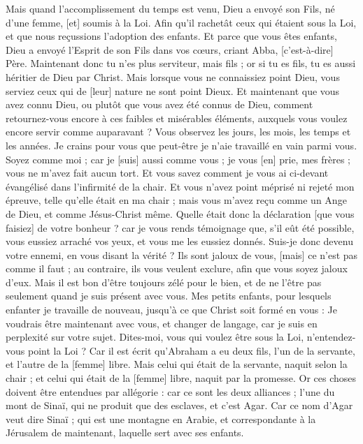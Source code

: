\begin{multicols}{2}
Mais quand l'accomplissement du temps est venu, Dieu a envoyé son Fils, né d'une femme, [et] soumis à la Loi.
Afin qu'il rachetât ceux qui étaient sous la Loi, et que nous reçussions l'adoption des enfants.
Et parce que vous êtes enfants, Dieu a envoyé l'Esprit de son Fils dans vos cœurs, criant Abba, [c'est-à-dire] Père.
Maintenant donc tu n'es plus serviteur, mais fils ; or si tu es fils, tu es aussi héritier de Dieu par Christ.
Mais lorsque vous ne connaissiez point Dieu, vous serviez ceux qui de [leur] nature ne sont point Dieux.
Et maintenant que vous avez connu Dieu, ou plutôt que vous avez été connus de Dieu, comment retournez-vous encore à ces faibles et misérables éléments, auxquels vous voulez encore servir comme auparavant ?
Vous observez les jours, les mois, les temps et les années.
Je crains pour vous que peut-être je n'aie travaillé en vain parmi vous.
Soyez comme moi ; car je [suis] aussi comme vous ; je vous [en] prie, mes frères ; vous ne m'avez fait aucun tort.
Et vous savez comment je vous ai ci-devant évangélisé dans l'infirmité de la chair.
Et vous n'avez point méprisé ni rejeté mon épreuve, telle qu'elle était en ma chair ; mais vous m'avez reçu comme un Ange de Dieu, et comme Jésus-Christ même.
Quelle était donc la déclaration [que vous faisiez] de votre bonheur ? car je vous rends témoignage que, s'il eût été possible, vous eussiez arraché vos yeux, et vous me les eussiez donnés.
Suis-je donc devenu votre ennemi, en vous disant la vérité ?
Ils sont jaloux de vous, [mais] ce n'est pas comme il faut ; au contraire, ils vous veulent exclure, afin que vous soyez jaloux d'eux.
Mais il est bon d'être toujours zélé pour le bien, et de ne l'être pas seulement quand je suis présent avec vous.
Mes petits enfants, pour lesquels enfanter je travaille de nouveau, jusqu'à ce que Christ soit formé en vous :
Je voudrais être maintenant avec vous, et changer de langage, car je suis en perplexité sur votre sujet.
Dites-moi, vous qui voulez être sous la Loi, n'entendez-vous point la Loi ?
Car il est écrit qu'Abraham a eu deux fils, l'un de la servante, et l'autre de la [femme] libre.
Mais celui qui était de la servante, naquit selon la chair ; et celui qui était de la [femme] libre, naquit par la promesse.
Or ces choses doivent être entendues par allégorie : car ce sont les deux alliances ; l'une du mont de Sinaï, qui ne produit que des esclaves, et c'est Agar.
Car ce nom d'Agar veut dire Sinaï ; qui est une montagne en Arabie, et correspondante à la Jérusalem de maintenant, laquelle sert avec ses enfants.

\end{multicols}
